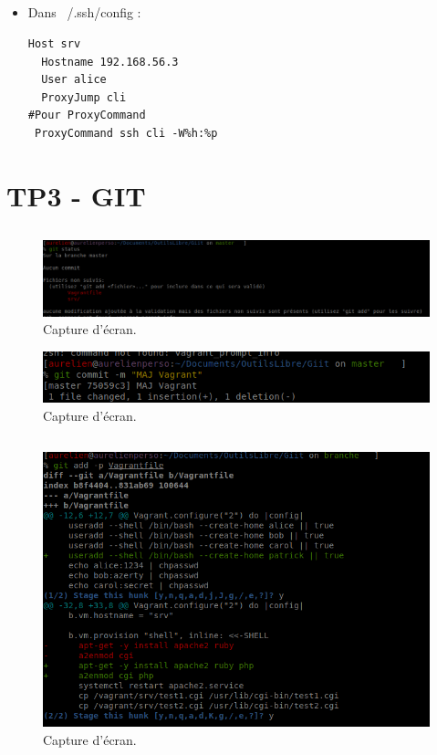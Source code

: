 \documentclass{article}
\begin{document}
\subsection{}
\begin{itemize}
    \item Dans ~/.ssh/config :
\begin{lstlisting}
Host srv
  Hostname 192.168.56.3
  User alice
  ProxyJump cli
#Pour ProxyCommand
 ProxyCommand ssh cli -W%h:%p
\end{lstlisting}
\end{itemize}

\newpage

\section{TP3 - GIT}

\subsection{}

\begin{figure}[h]
\centering
\includegraphics[width=\textwidth]{screen/git1.png}
\caption{\label{fig:frog}Capture d'écran.}
\end{figure}

\begin{figure}[h]
\centering
\includegraphics[width=0.7\columnwidth]{screen/git2.png}
\caption{\label{fig:frog}Capture d'écran.}
\end{figure}

\subsection{}

\begin{figure}[h]
\centering
\includegraphics[width=0.7\columnwidth]{screen/git2_1.png}
\caption{\label{fig:frog}Capture d'écran.}
\end{figure}
\end{document}
